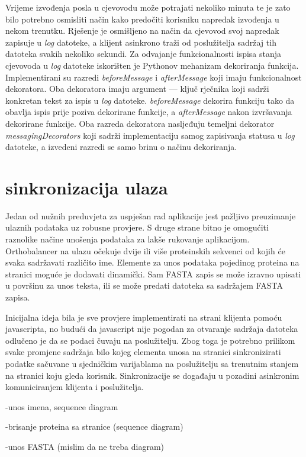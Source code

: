     
Vrijeme izvođenja posla u cjevovodu može potrajati nekoliko minuta te je zato
bilo potrebno osmisliti način kako predočiti korisniku napredak izvođenja u
nekom trenutku. Rješenje je osmišljeno na način da cjevovod svoj napredak
zapisuje u \emph{log} datoteke, a klijent asinkrono traži od poslužitelja
sadržaj tih datoteka svakih nekoliko sekundi. Za odvajanje funkcionalnosti
ispisa stanja cjevovoda u \emph{log} datoteke iskorišten je Pythonov mehanizam
dekoriranja funkcija. Implementirani su razredi \emph{beforeMessage} i
\emph{afterMessage} koji imaju funkcionalnost dekoratora. Oba dekoratora imaju
argument --- ključ rječnika koji sadrži konkretan tekst za ispis u \emph{log}
datoteke. \emph{beforeMessage} dekorira funkciju tako da obavlja ispis prije
poziva dekorirane funkcije, a \emph{afterMessage} nakon izvršavanja dekorirane
funkcije. Oba razreda dekoratora nasljeđuju temeljni dekorator
\emph{messagingDecorators} koji sadrži implementaciju samog zapisivanja statusa
u \emph{log} datoteke, a izvedeni razredi se samo brinu o načinu dekoriranja.



\section{sinkronizacija ulaza}
\label{sec:input}


Jedan od nužnih preduvjeta za uspješan rad aplikacije jest pažljivo preuzimanje
ulaznih podataka uz robusne provjere. S druge strane bitno je omogućiti
raznolike načine unošenja podataka za lakše rukovanje aplikacijom. Orthobalancer
na ulazu očekuje dvije ili više proteinskih sekvenci od kojih će svaka
sadržavati različito ime. Elemente za unos podataka pojedinog proteina na
stranici moguće je dodavati dinamički. Sam FASTA zapis se može izravno upisati u
površinu za unos teksta, ili se može predati datoteka sa sadržajem FASTA zapisa.

Inicijalna ideja bila je sve provjere implementirati na strani klijenta pomoću
javascripta, no budući da javascript nije pogodan za otvaranje sadržaja datoteka
odlučeno je da se podaci čuvaju na poslužitelju. Zbog toga je potrebno prilikom
svake promjene sadržaja bilo kojeg elementa unosa na stranici sinkronizirati
podatke sačuvane u sjedničkim varijablama na poslužitelju sa trenutnim stanjem
na stranici koju gleda korisnik. Sinkronizacije se događaju u pozadini
asinkronim komuniciranjem klijenta i poslužitelja.

-unos imena, sequence diagram

-brisanje proteina sa stranice (sequence
diagram)

-unos FASTA (mislim da ne treba diagram)
